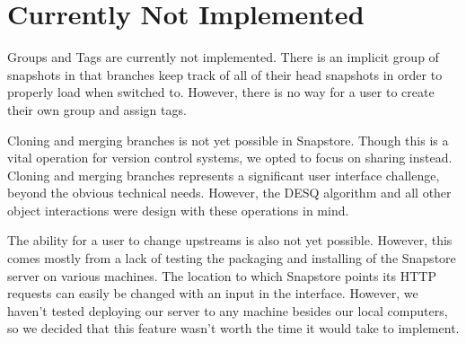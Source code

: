 \section{Currently Not Implemented}

Groups and Tags are currently not implemented. There is an implicit group of snapshots in that branches keep track of all of their head snapshots in order to properly load when switched to. However, there is no way for a user to create their own group and assign tags.

Cloning and merging branches is not yet possible in Snapstore. Though this is a vital operation for version control systems, we opted to focus on sharing instead. Cloning and merging branches represents a significant user interface challenge, beyond the obvious technical needs. However, the DESQ algorithm and all other object interactions were design with these operations in mind.

The ability for a user to change upstreams is also not yet possible. However, this comes mostly from a lack of testing the packaging and installing of the Snapstore server on various machines. The location to which Snapstore points its HTTP requests can easily be changed with an input in the interface. However, we haven't tested deploying our server to any machine besides our local computers, so we decided that this feature wasn't worth the time it would take to implement.